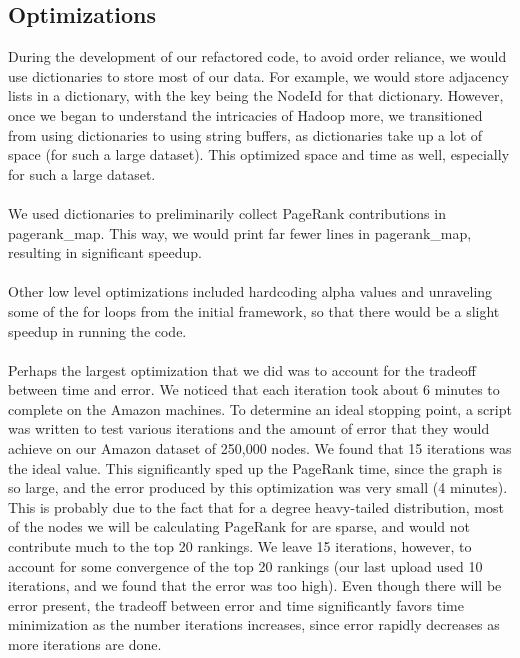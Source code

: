 \documentclass{article}
\begin{document}

\subsection*{Optimizations}
During the development of our refactored code, to avoid order reliance, we would use dictionaries to store most of our data. For example, we would store adjacency lists in a dictionary, with the key being the NodeId for that dictionary. However, once we began to understand the intricacies of Hadoop more, we transitioned from using dictionaries to using string buffers, as dictionaries take up a lot of space (for such a large dataset). This optimized space and time as well, especially for such a large dataset.\\ \\
We used dictionaries to preliminarily collect PageRank contributions in pagerank\_map. This way, we would print far fewer lines in pagerank\_map, resulting in significant speedup.
\\ \\
Other low level optimizations included hardcoding alpha values and unraveling some of the for loops from the initial framework, so that there would be a slight speedup in running the code.
\\ \\
Perhaps the largest optimization that we did was to account for the tradeoff between time and error. We noticed that each iteration took about 6 minutes to complete on the Amazon machines. To determine an ideal stopping point, a script was written to test various iterations and the amount of error that they would achieve on our Amazon dataset of 250,000 nodes. We found that 15 iterations was the ideal value. This significantly sped up the PageRank time, since the graph is so large, and the error produced by this optimization was very small (4 minutes). This is probably due to the fact that for a degree heavy-tailed distribution, most of the nodes we will be calculating PageRank for are sparse, and would not contribute much to the top 20 rankings. We leave 15 iterations, however, to account for some convergence of the top 20 rankings (our last upload used 10 iterations, and we found that the error was too high). Even though there will be error present, the tradeoff between error and time significantly favors time minimization as the number iterations increases, since error rapidly decreases as more iterations are done.
\end{document}
